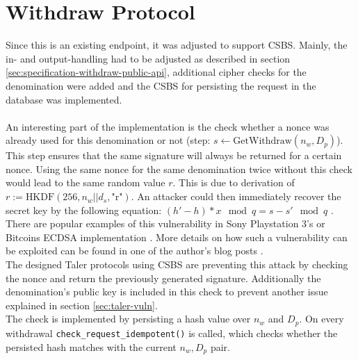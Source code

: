 \section{Withdraw Protocol}
\label{sec:withdraw-protocol-impl}
Since this is an existing endpoint, it was adjusted to support \gls{CSBS}.
Mainly, the in- and output-handling had to be adjusted as described in section \ref{sec:specification-withdraw-public-api}, additional cipher checks for the denomination were added and the \gls{CSBS} for persisting the request in the database was implemented.
\\\\
An interesting part of the implementation is the check whether a nonce was already used for this denomination or not (step: $s \leftarrow \text{GetWithdraw}(n_w, D_p)$).
This step ensures that the same signature will always be returned for a certain nonce.
Using the same nonce for the same denomination twice without this check would lead to the same random value $r$.
This is due to derivation of $r := \text{HKDF}(256,n_w || d_s, \text{"r"})$.
An attacker could then immediately recover the secret key by the following equation: $(h' - h) * x \mod q = s -s' \mod q$ \cite{tibouchi:attacks-schnorr-nonce}.
There are popular examples of this vulnerability in Sony Playstation 3's or Bitcoins ECDSA implementation \cite{buchanan:ps3-ecdsa-vuln} \cite{wang:bitcoin-ecdsa-vuln}.
More details on how such a vulnerability can be exploited can be found in one of the author's blog posts \cite{gian:nonce-sense}.\\
The designed Taler protocols using \gls{CSBS} are preventing this attack by checking the nonce and return the previously generated signature.
Additionally the denomination's public key is included in this check to prevent another issue explained in section \ref{sec:taler-vuln}.\\
The check is implemented by persisting a hash value over $n_w$ and $D_p$.
On every withdrawal \texttt{check\_request\_idempotent()} is called, which checks whether the persisted hash matches with the current $n_w, D_p$ pair.


